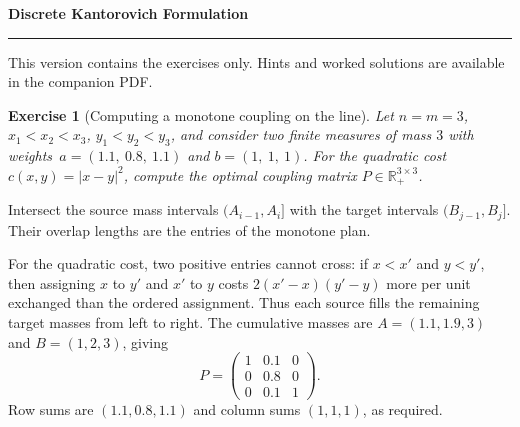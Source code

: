 \documentclass[11pt,a4paper]{article}
\theoremstyle{exostyle}
\newtheorem{exercise}{Exercise}
\newif\ifcorr
\newcommand{\R}{\mathbb{R}}
\renewcommand{\maketitle}{\thispagestyle{plain}\begingroup
  \color{heading}\LARGE\bfseries\SheetTitle\par\endgroup
  \vspace{3pt}{\large\ifcorr Statements, hints and worked solutions\else Exercise statements\fi}\par
  \vspace{7pt}\hrule\vspace{9pt}
  \ifcorr Each exercise is followed by question-by-question hints and a worked solution.
  Try the questions before reading the hints.\else
  This version contains the exercises only. Hints and worked solutions are available in the companion PDF.\fi
  \par\medskip}
\newcommand{\SheetTitle}{Discrete Kantorovich Formulation}
\begin{document}
\maketitle

\begin{exercise}[Computing a monotone coupling on the line]\label{ex:discrete13}
Let $n=m=3$, $x_1<x_2<x_3$, $y_1<y_2<y_3$, and consider two finite measures of mass $3$ with weights
$\,a=(1.1,\ 0.8,\ 1.1)$ and $b=(1,\ 1,\ 1)$. For the quadratic cost $c(x,y)=|x-y|^2$, compute the optimal coupling matrix $P\in\R_+^{3\times3}$.
\end{exercise}
\begin{hints}
Intersect the source mass intervals $(A_{i-1},A_i]$ with the target intervals $(B_{j-1},B_j]$. Their overlap lengths are the entries of the monotone plan.
\end{hints}
\begin{solution}
For the quadratic cost, two positive entries cannot cross: if $x<x'$ and $y<y'$, then assigning $x$ to $y'$ and $x'$ to $y$ costs $2(x'-x)(y'-y)$ more per unit exchanged than the ordered assignment. Thus each source fills the remaining target masses from left to right. The cumulative masses are $A=(1.1,1.9,3)$ and $B=(1,2,3)$, giving
\[
P=\begin{pmatrix}
1 & 0.1 & 0\\
0 & 0.8 & 0\\
0 & 0.1 & 1
\end{pmatrix}.
\]
Row sums are $(1.1,0.8,1.1)$ and column sums $(1,1,1)$, as required.
\end{solution}
\end{document}
